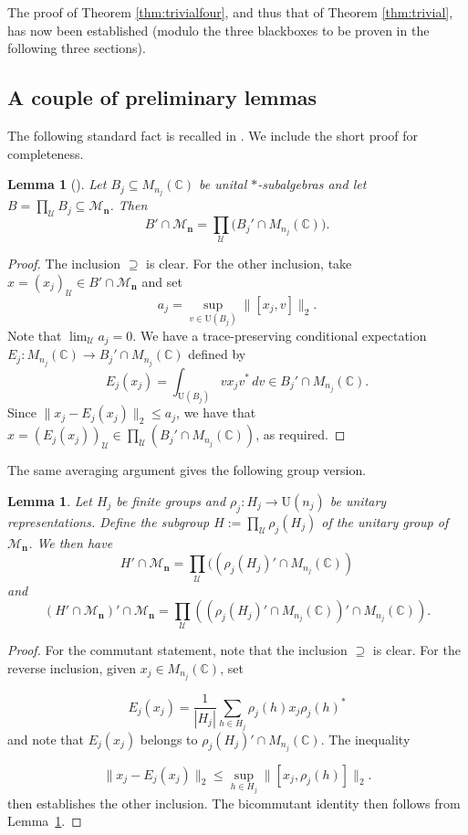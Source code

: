 \documentclass[12pt]{amsart}
\numberwithin{equation}{section}
\newtheorem{lem}[thm]{Lemma}
\theoremstyle{definition}
\newcommand{\C}{\mathbb{C}}
\def\cal{\mathcal}
\def\M{\mathcal{M}}
\newcommand\cU{{\cal U}}
\def \M{\mathcal{M}}
\begin{document}
The proof of Theorem \ref{thm:trivialfour}, and thus that of Theorem \ref{thm:trivial}, has now been established (modulo the three blackboxes to be proven in the following three sections).

\subsection{A couple of preliminary lemmas}The following standard fact is recalled in
\cite[Section~1.6]{Popa2014}.
We include the short proof for completeness.

\begin{lem}[{\cite[Section~1.6]{Popa2014}}]
\label{rec:internal-algebra}
Let $B_j\subseteq M_{n_j}(\C)$ be unital $*$-subalgebras and let
$B=\prod_{\cU} B_j\subseteq \M_{\mathbf{n}}$.  Then
\[
 B'\cap \M_{\mathbf{n}}=\prod_{\cU}\bigl(B_j'\cap M_{n_j}(\C)\bigr).
\]
\end{lem}

\begin{proof}
The inclusion $\supseteq$ is clear.  For
the other inclusion, take $x=(x_j)_\cU\in B'\cap \M_{\mathbf{n}}$ and set
\[
 a_j=\sup_{v\in\mathrm U(B_j)}\|[x_j,v]\|_{2}.
\]
Note that $\lim_\cU a_j=0$.  We have a trace-preserving conditional expectation $E_j:M_{n_j}(\C)\to B_j'\cap M_{n_j}(\C)$ defined by 
\[
 E_j(x_j)=\int_{\mathrm U(B_j)}v x_jv^*\,dv
 \in B_j'\cap M_{n_j}(\C).
\]
Since
$\|x_j-E_j(x_j)\|_2\leq a_j$, we have that $x=(E_j(x_j))_\cU\in \prod_\cU (B_j'\cap M_{n_j}(\C))$,
as required.
\end{proof}
The same averaging argument gives the following group version.
\begin{lem}
\label{rec:internal-group}
Let $H_j$ be finite groups and
$\rho_j:H_j\to\mathrm U(n_j)$ be unitary representations.  Define
the subgroup $H:=\prod_\cU \rho_j(H_j)$ of the unitary group of $\M_{\mathbf{n}}$.
We then have
\[
 H'\cap \M_{\mathbf{n}}=\prod_{\cU}((\rho_j(H_j)'\cap M_{n_j}(\C))
\]
and 
\[
 (H'\cap \M_{\mathbf{n}})'\cap \M_{\mathbf{n}}=\prod_{\cU}\left((\rho_j(H_j)'\cap M_{n_j}(\C))'\cap M_{n_j}(\C)\right).
\]
\end{lem}

\begin{proof}
For the commutant statement, note that the inclusion $\supseteq$ is clear.  For the reverse inclusion, given $x_j\in M_{n_j}(\C)$, set 

\[
 E_j(x_j)=\frac1{|H_j|}\sum_{h\in H_j}
       \rho_j(h)x_j\rho_j(h)^*
       \]
and note that $E_j(x_j)$ belongs to $\rho_j(H_j)'\cap M_{n_j}(\C)$.
The inequality
    
\[
 \|x_j-E_j(x_j)\|_2
 \leq\sup_{h\in H_j}\|[x_j,\rho_j(h)]\|_2.
\]
then establishes the other inclusion.  
The bicommutant identity then follows from 
Lemma~\ref{rec:internal-algebra}.
\end{proof}
\end{document}
